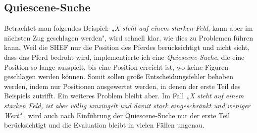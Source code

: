 \documentclass{jpp}
\begin{document}
\subsection{Quiescene-Suche}
Betrachtet man folgendes Beispiel: \textit{„X steht auf einem starken Feld}, kann aber im nächsten Zug geschlagen werden", wird schnell klar, wie dies zu Problemen führen kann. Weil die SHEF nur die Position des Pferdes berücksichtigt und nicht sieht, dass das Pferd bedroht wird, implementierte ich eine \textit{Quiescene-Suche}, die eine Position so lange ausspielt, bis eine Position erreicht ist, wo keine Figuren geschlagen werden können. Somit sollen große Entscheidungsfehler behoben werden, indem nur Positionen ausgewertet werden, in denen der erste Teil des Beispiels zutrifft.
Ein weiteres Problem bleibt aber. Im Fall \textit{„X steht auf einem starken Feld, ist aber völlig umzingelt und damit stark eingeschränkt und weniger Wert"} , wird auch nach Einführung der Quiescene-Suche nur der erste Teil berücksichtigt und die Evaluation bleibt in vielen Fällen ungenau.
\end{document}

